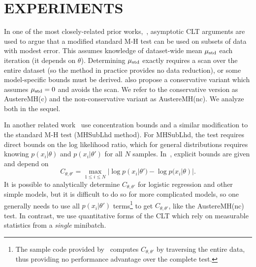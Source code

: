 \documentclass[letterpaper]{article}
\begin{document}
\section{EXPERIMENTS}\label{sec:experiments}
In one of the most closely-related prior
works,~\citep{cutting_mh_2014}, asymptotic CLT arguments are used to
argue that a modified standard M-H test can be used on subsets of data
with modest error. This assumes knowledge of dataset-wide mean
$\mu_{\rm std}$ each iteration (it depends on $\theta$). Determining
$\mu_{\rm std}$ exactly requires a scan over the entire dataset (so
the method in practice provides no data reduction), or some
model-specific bounds must be derived.  \citep{cutting_mh_2014} also
propose a conservative variant which assumes $\mu_{\rm std}=0$ and
avoids the scan.  We refer to the conservative version as {\sc
  AustereMH(c)} and the non-conservative variant as {\sc
  AustereMH(nc)}. We analyze both in the sequel.

In another related work~\citep{icml2014c1_bardenet14} use concentration bounds
and a similar modification to the standard M-H test ({\sc MHSubLhd} method). 
For {\sc MHSubLhd}, the test requires direct bounds on the log likelihood ratio,
which for general distributions requires knowing $p(x_i | \theta)$ and $p(x_i |
\theta')$ for all $N$ samples. In~\citep{icml2014c1_bardenet14}, explicit bounds
are given and depend on
\begin{equation}\label{eq:bad_bound}
    C_{\theta, \theta'} = \max_{1\leq i\leq N}|\log p(x_i | \theta') - \log p(x_i | \theta)|.
\end{equation}
It is possible to analytically determine $C_{\theta,\theta'}$ for logistic
regression and other simple models, but it is difficult to do so for more
complicated models, so one generally needs to use all $p(x_i | \theta')$
terms\footnote{The sample code provided by~\citep{icml2014c1_bardenet14}
computes $C_{\theta,\theta'}$ by traversing the entire data, thus providing no
performance advantage over the complete test.} to get $C_{\theta,\theta'}$, like
the {\sc AustereMH(nc)} test.  In contrast, we use quantitative forms of the CLT
which rely on measurable statistics from a \emph{single} minibatch.
\end{document}
